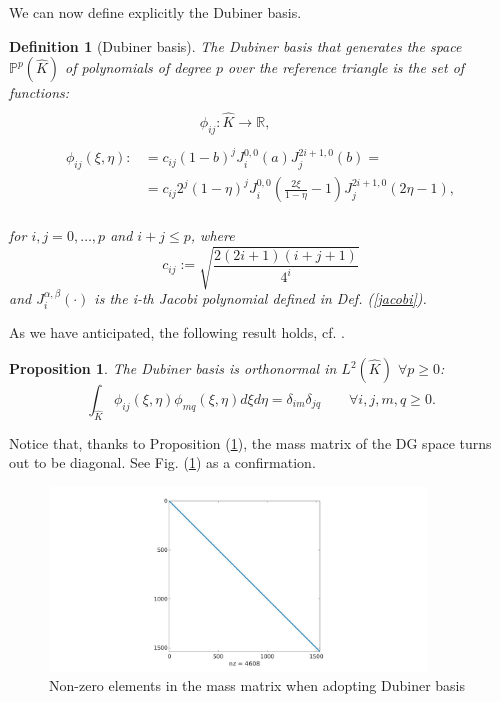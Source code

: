 \documentclass[a4paper,11pt]{article}
\newtheorem{definition}{Definition}
\newtheorem{prop}{Proposition}
\begin{document}
    \noindent We can now define explicitly the Dubiner basis.
    \begin{definition}[Dubiner basis] \label{dubiner}
    The Dubiner basis that generates the space $\mathbb{P}^p(\hat{K})$ of polynomials of degree $p$ over the reference triangle is the set of functions:
    \begin{equation*}
    \begin{split}
    \\
    & \quad \quad\quad  \quad \phi_{ij}: \hat{K} \rightarrow \mathbb{R}, \\ \\
    \phi_{ij}(\xi,\eta) :&= c_{ij}(1-b)^j J_i^{0,0}(a) J_j^{2i+1,0}(b)=
    \\&=c_{ij} 2^j (1-\eta)^j J_i^{0,0}(\frac{2\xi}{1-\eta}-1) J_j^{2i+1,0} (2\eta-1),
    \end{split}
    \end{equation*}
    \vspace{3mm} \\
    for $i,j=0,\dots,p$ and $i+j \le p$, where
    \begin{equation*}
    c_{ij} := \sqrt{\frac{2(2i+1)(i+j+1)}{4^i}}
    \end{equation*}
    and $J_i^{\alpha,\beta}(\cdot)$ is the i-th Jacobi polynomial defined in Def. (\ref{jacobi}).
    \end{definition}
    
    \vspace{5mm}
    \noindent As we have anticipated, the following result holds, cf.  \cite{sherwin}.
    \begin{prop}\label{l2_ortho}
    The Dubiner basis is orthonormal in $L^2(\hat{K})$ $\forall p \geq 0$:
    \begin{equation*}
    \int_{\hat{K}}{\phi_{ij}(\xi,\eta)\phi_{mq}(\xi,\eta) d\xi d\eta}=\delta_{im}\delta_{jq} \qquad \forall i,j,m,q \geq 0.
    \end{equation*}
    \end{prop}
    \vspace{4mm}
    \noindent Notice that, thanks to Proposition (\ref{l2_ortho}), the mass matrix of the DG space turns out to be diagonal. See Fig. (\ref{mass}) as a confirmation.
    
    \begin{figure}[ht]
    \begin{center}
    \includegraphics[width = 10cm]{./mass_dubiner.jpg}
    	\caption{Non-zero elements in the mass matrix when adopting Dubiner basis}
    	\label{mass}
    \end{center}
    \end{figure}
\end{document}

